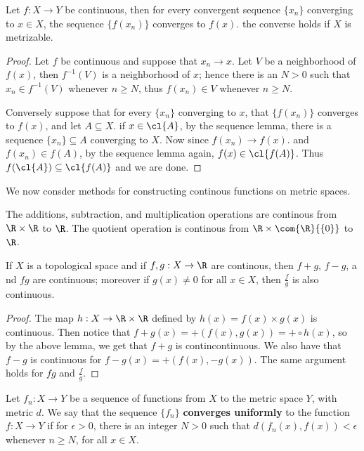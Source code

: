 \begin{theorem}\label{2.3.6}
    Let $f:X \rightarrow Y$ be continuous, then for every convergent sequence  $\{x_n\}$ converging
    to $x \in X$, the sequence  $\{f(x_n)\}$ converges to $f(x)$. the converse holds if $X$ is
    metrizable.
\end{theorem}
\begin{proof}
    Let $f$ be continuous and suppose that  $x_n \rightarrow x$. Let  $V$ be a neighborhood of
    $f(x)$, then $f^{-1}(V)$ is a neighborhood of $x$; hence there is an  $N>0$ such that  $x_n \in
    f^{-1}(V)$ whenever $n \geq N$, thus  $f(x_n) \in V$ whenever $n \geq N$.

    Conversely suppose that for every  $\{x_n\}$ converging to $x$, that  $\{f(x_n)\}$ converges to
    $f(x)$, and let $A \subseteq X$. if  $x \in \cl{A}$, by the sequence lemma, there is a sequence
    $\{x_n\} \subseteq A$ converging to $X$. Now since  $f(x_n) \rightarrow f(x)$. and $f(x_n) \in
    f(A)$, by the sequence lemma again, $f(x) \in \cl{f(A)}$.  Thus $f(\cl{A}) \subseteq
    \cl{f(A)}$ and we are done.
\end{proof}

We now consder methods for constructing continous functions on metric spaces.

\begin{lemma}\label{2.3.7}
    The additions, subtraction, and multiplication operations are continous from $\R \times \R$ to
    $\R$. The quotient operation is continous from  $\R \times \com{\R}{\{0\}}$ to $\R$.
\end{lemma}

\begin{theorem}\label{2.3.8}
    If $X$ is a topological space and if  $f,g:X \rightarrow \R$ are continous, then  $f+g$,  $f-g$,
    a nd $fg$ are continuous; moreover if  $g(x) \neq 0$ for all $x \in X$, then $\frac{f}{g}$ is
    also continuous.
\end{theorem}
\begin{proof}
    The map $h:X \rightarrow \R \times \R$ defined by $h(x)=f(x) \times g(x)$ is continuous. Then
    notice that $f+g(x)=+(f(x),g(x))=+\circ h(x)$, so by the above lemma, we get that $f+g$ is
    contincontinuous. We also have that  $f-g$ is continuous for  $f-g(x)=+(f(x),-g(x))$. The same
    argument holds for $fg$ and  $ \frac{f}{g}$.
\end{proof}

\begin{definition}
    Let $f_n:X \rightarrow Y$ be a sequence of functions from $X$ to the metric space  $Y$, with
    metric  $d$. We say that the sequence  $\{f_n\}$ \textbf{converges uniformly} to the function
    $f:X \rightarrow Y$ if for  $\epsilon>0$, there is an integer $N>0$ such that
    $d(f_n(x),f(x))<\epsilon$ whenever $n \geq N$, for all  $x \in X$.
\end{definition}


